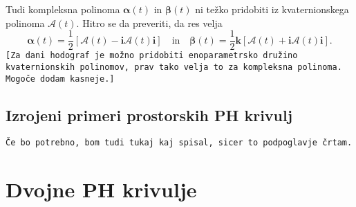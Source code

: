 \documentclass[12pt,a4paper,twoside]{article}
\theoremstyle{definition} %
\theoremstyle{plain} %
\numberwithin{equation}{section}  %
\begin{document}
Tudi kompleksna polinoma $\boldsymbol\alpha(t)$ in $\boldsymbol\beta(t)$ ni težko pridobiti iz kvaternionskega polinoma $\mathcal{A}(t).$ Hitro se da preveriti, da res velja
\begin{equation}
	\label{quat_to_comp}
		\boldsymbol\alpha(t) = \frac{1}{2}[\mathcal{A}(t)-\mathbf{i}\mathcal{A}(t)\mathbf{i}] \quad \text{in} \quad \boldsymbol\beta(t)= \frac{1}{2}\mathbf{k}[\mathcal{A}(t)+\mathbf{i}\mathcal{A}(t)\mathbf{i}].
\end{equation}
\texttt{[Za dani hodograf je možno pridobiti enoparametrsko družino kvaternionskih polinomov, prav tako velja to za kompleksna polinoma. Mogoče dodam kasneje.]}

\subsection{Izrojeni primeri prostorskih PH krivulj}

\texttt{Če bo potrebno, bom tudi tukaj kaj spisal, sicer to podpoglavje črtam.}

\section{Dvojne PH krivulje}


\end{document}
